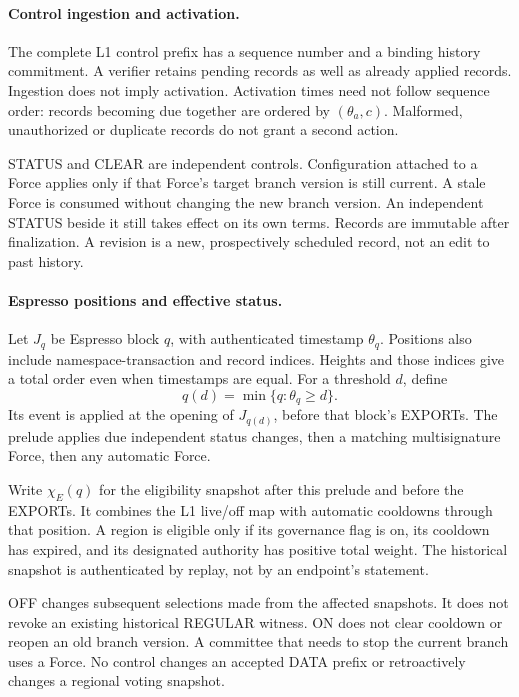 \documentclass[11pt,a4paper]{article}
\begin{document}
\paragraph{Control ingestion and activation.}
The complete L1 control prefix has a sequence number and a binding
history commitment. A verifier retains pending records as well as
already applied records. Ingestion does not imply activation.
Activation times need not follow sequence order: records becoming due
together are ordered by $(\theta_a,c)$. Malformed, unauthorized or
duplicate records do not grant a second action.

STATUS and CLEAR are independent controls. Configuration attached to
a Force applies only if that Force's target branch version is still current.
A stale Force is consumed without changing the new branch version. An independent
STATUS beside it still takes effect on its own terms.
Records are immutable after finalization. A revision is a new,
prospectively scheduled record, not an edit to past history.

\paragraph{Espresso positions and effective status.}
Let $J_q$ be Espresso block $q$, with authenticated timestamp
$\theta_q$. Positions also include namespace-transaction and record
indices. Heights and those indices give a total order even when
timestamps are equal. For a threshold $d$, define
\[
 q(d)=\min\{q:\theta_q\ge d\}.
\]
Its event is applied at the opening of $J_{q(d)}$, before that block's
EXPORTs. The prelude applies due independent status changes, then a
matching multisignature Force, then any automatic Force.

Write $\chi_E(q)$ for the eligibility snapshot after this prelude and
before the EXPORTs. It combines the L1 live/off map with automatic
cooldowns through that position. A region is eligible only if its
governance flag is on, its cooldown has expired, and its designated
authority has positive total weight. The historical snapshot is
authenticated by replay, not by an endpoint's statement.

OFF changes subsequent selections made from the affected snapshots.
It does not revoke an existing historical REGULAR witness. ON does not
clear cooldown or reopen an old branch version. A committee that needs to stop
the current branch uses a Force. No control changes an accepted DATA
prefix or retroactively changes a regional voting snapshot.
\end{document}
